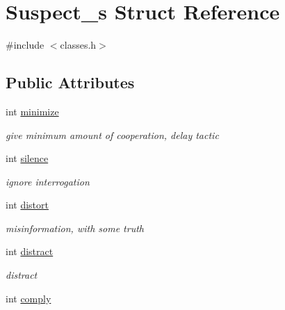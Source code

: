 \hypertarget{struct_suspect__s}{\section{Suspect\+\_\+s Struct Reference}
\label{struct_suspect__s}
}


{\ttfamily \#include $<$classes.\+h$>$}

\subsection*{Public Attributes}
\begin{DoxyCompactItemize}
\item 
\hypertarget{struct_suspect__s_a0bdb6fa57ffea54acd294d24b749fb95}{int \hyperlink{struct_suspect__s_a0bdb6fa57ffea54acd294d24b749fb95}{minimize}}\label{struct_suspect__s_a0bdb6fa57ffea54acd294d24b749fb95}

\begin{DoxyCompactList}\small\item\em give minimum amount of cooperation, delay tactic \end{DoxyCompactList}\item 
\hypertarget{struct_suspect__s_a2bb8b0ca3470b4dfb856f631b7ac5da0}{int \hyperlink{struct_suspect__s_a2bb8b0ca3470b4dfb856f631b7ac5da0}{silence}}\label{struct_suspect__s_a2bb8b0ca3470b4dfb856f631b7ac5da0}

\begin{DoxyCompactList}\small\item\em ignore interrogation \end{DoxyCompactList}\item 
\hypertarget{struct_suspect__s_aa3f819eebfe94a0a230be569ddab0d52}{int \hyperlink{struct_suspect__s_aa3f819eebfe94a0a230be569ddab0d52}{distort}}\label{struct_suspect__s_aa3f819eebfe94a0a230be569ddab0d52}

\begin{DoxyCompactList}\small\item\em misinformation, with some truth \end{DoxyCompactList}\item 
\hypertarget{struct_suspect__s_a2d2d292796fa66c5fa553cb55beb8131}{int \hyperlink{struct_suspect__s_a2d2d292796fa66c5fa553cb55beb8131}{distract}}\label{struct_suspect__s_a2d2d292796fa66c5fa553cb55beb8131}

\begin{DoxyCompactList}\small\item\em distract \end{DoxyCompactList}\item 
\hypertarget{struct_suspect__s_a8f5208d18939f62750ffe03a479023ff}{int \hyperlink{struct_suspect__s_a8f5208d18939f62750ffe03a479023ff}{comply}}\label{struct_suspect__s_a8f5208d18939f62750ffe03a479023ff}


\end{DoxyCompactItemize}
